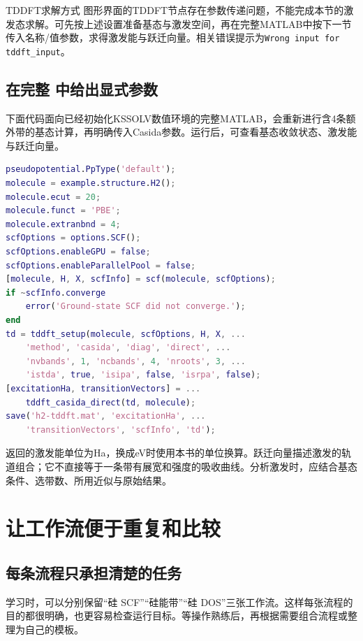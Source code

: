 \begin{notebox}{TDDFT求解方式}
图形界面的TDDFT节点存在参数传递问题，不能完成本节的激发态求解。可先按上述设置准备基态与激发空间，再在完整MATLAB\regmark{}中按下一节传入名称/值参数，求得激发能与跃迁向量。相关错误提示为\texttt{Wrong input for tddft\_input}。
\end{notebox}

\subsection{在完整 \regmark{} 中给出显式参数}

下面代码面向已经初始化KSSOLV数值环境的完整MATLAB\regmark{}，会重新进行含4条额外带的基态计算，再明确传入Casida参数。运行后，可查看基态收敛状态、激发能与跃迁向量。

\noindent\begin{minipage}{\linewidth}
\begin{lstlisting}[language=Matlab]
pseudopotential.PpType('default');
molecule = example.structure.H2();
molecule.ecut = 20;
molecule.funct = 'PBE';
molecule.extranbnd = 4;
scfOptions = options.SCF();
scfOptions.enableGPU = false;
scfOptions.enableParallelPool = false;
[molecule, H, X, scfInfo] = scf(molecule, scfOptions);
if ~scfInfo.converge
    error('Ground-state SCF did not converge.');
end
td = tddft_setup(molecule, scfOptions, H, X, ...
    'method', 'casida', 'diag', 'direct', ...
    'nvbands', 1, 'ncbands', 4, 'nroots', 3, ...
    'istda', true, 'isipa', false, 'isrpa', false);
[excitationHa, transitionVectors] = ...
    tddft_casida_direct(td, molecule);
save('h2-tddft.mat', 'excitationHa', ...
    'transitionVectors', 'scfInfo', 'td');
\end{lstlisting}
\end{minipage}

返回的激发能单位为Ha，换成eV时使用本书的单位换算。跃迁向量描述激发的轨道组合；它不直接等于一条带有展宽和强度的吸收曲线。分析激发时，应结合基态条件、选带数、所用近似与原始结果。


\section{让工作流便于重复和比较}

\subsection{每条流程只承担清楚的任务}

学习时，可以分别保留“硅 SCF”“硅能带”“硅 DOS”三张工作流。这样每张流程的目的都很明确，也更容易检查运行目标。等操作熟练后，再根据需要组合流程或整理为自己的模板。

